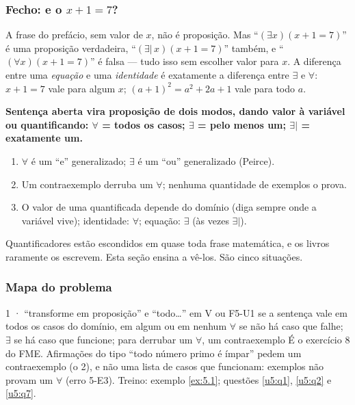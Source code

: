 \subsubsection{Fecho: e o $x+1=7$?}
A frase do prefácio, sem valor de $x$, não é proposição. Mas \enquote{$(\exists x)(x+1=7)$} é uma proposição verdadeira, \enquote{$(\exists|\,x)(x+1=7)$} também, e \enquote{$(\forall x)(x+1=7)$} é falsa — tudo isso sem escolher valor para $x$. A diferença entre uma \emph{equação} e uma \emph{identidade} é exatamente a diferença entre $\exists$ e $\forall$: $x+1=7$ vale para algum $x$; $(a+1)^2=a^2+2a+1$ vale para todo $a$.

\begin{paralembrar}\label{lembrar-u5}
\textbf{Sentença aberta vira proposição de dois modos, dando valor à variável ou quantificando: $\forall$ = todos os casos; $\exists$ = pelo menos um; $\exists|$ = exatamente um.}
\begin{enumerate}[label=\arabic*.,leftmargin=1.4em]
  \item $\forall$ é um \enquote{e} generalizado; $\exists$ é um \enquote{ou} generalizado (Peirce).
  \item Um contraexemplo derruba um $\forall$; nenhuma quantidade de exemplos o prova.
  \item O valor de uma quantificada depende do domínio (diga sempre onde a variável vive); identidade: $\forall$; equação: $\exists$ (às vezes $\exists|$).
\end{enumerate}
\end{paralembrar}

\OndeEUsado

Quantificadores estão escondidos em quase toda frase matemática, e os livros raramente os escrevem. Esta seção ensina a vê-los. São cinco situações.

\subsubsection{Mapa do problema}

\begin{caso}{1 · \enquote{transforme em proposição} e \enquote{todo\ldots} em V ou F}{5-U1}
{se a sentença vale em todos os casos do domínio, em algum ou em nenhum}
{$\forall$ se não há caso que falhe; $\exists$ se há caso que funcione; para derrubar um $\forall$, um contraexemplo}
\reconhecer É o exercício 8 do FME. Afirmações do tipo \enquote{todo número primo é ímpar} pedem um contraexemplo (o 2), e não uma lista de casos que funcionam: exemplos não provam um $\forall$ (erro 5-E3). Treino: exemplo \ref{ex:5.1}; questões \ref{u5:q1}, \ref{u5:q2} e \ref{u5:q7}.
\end{caso}

